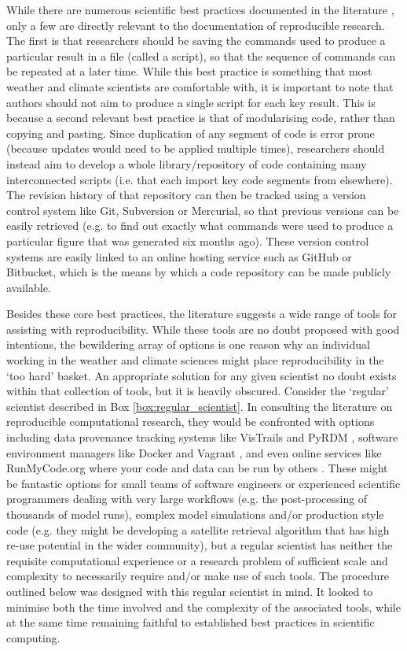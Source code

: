 While there are numerous scientific best practices documented in the literature \citep[e.g.][]{Wilson2014a}, only a few are directly relevant to the documentation of reproducible research. The first is that researchers should be saving the commands used to produce a particular result in a file (called a script), so that the sequence of commands can be repeated at a later time. While this best practice is something that most weather and climate scientists are comfortable with, it is important to note that authors should not aim to produce a single script for each key result. This is because a second relevant best practice is that of modularising code, rather than copying and pasting. Since duplication of any segment of code is error prone (because updates would need to be applied multiple times), researchers should instead aim to develop a whole library/repository of code containing many interconnected scripts (i.e. that each import key code segments from elsewhere). The revision history of that repository can then be tracked using a version control system like Git, Subversion or Mercurial, so that previous versions can be easily retrieved (e.g. to find out exactly what commands were used to produce a particular figure that was generated six months ago). These version control systems are easily linked to an online hosting service such as GitHub or Bitbucket, which is the means by which a code repository can be made publicly available.

Besides these core best practices, the literature suggests a wide range of tools for assisting with reproducibility. While these tools are no doubt proposed with good intentions, the bewildering array of options is one reason why an individual working in the weather and climate sciences might place reproducibility in the `too hard' basket. An appropriate solution for any given scientist no doubt exists within that collection of tools, but it is heavily obscured. Consider the `regular' scientist described in Box \ref{box:regular_scientist}. In consulting the literature on reproducible computational research, they would be confronted with options including data provenance tracking systems like VisTrails \citep{Freire2012} and PyRDM \citep{Jacobs2014}, software environment managers like Docker and Vagrant \citep{Stodden2014}, and even online services like RunMyCode.org where your code and data can be run by others \citep{Stodden2012}. These might be fantastic options for small teams of software engineers or experienced scientific programmers dealing with very large workflows (e.g. the post-processing of thousands of model runs), complex model simulations and/or production style code (e.g. they might be developing a satellite retrieval algorithm that has high re-use potential in the wider community), but a regular scientist has neither the requisite computational experience or a research problem of sufficient scale and complexity to necessarily require and/or make use of such tools. The procedure outlined below was designed with this regular scientist in mind. It looked to minimise both the time involved and the complexity of the associated tools, while at the same time remaining faithful to established best practices in scientific computing.


